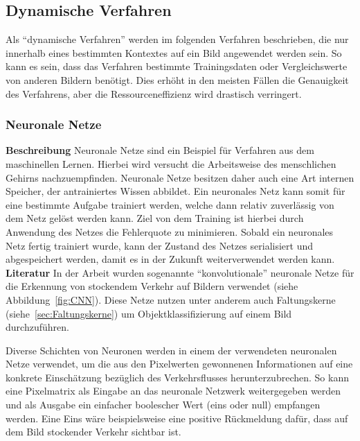\subsection{Dynamische Verfahren}
Als "`dynamische Verfahren"' werden im folgenden Verfahren beschrieben, die nur innerhalb eines bestimmten Kontextes auf ein Bild angewendet werden sein. So kann es sein, dass das Verfahren bestimmte Trainingsdaten oder Vergleichswerte von anderen Bildern benötigt. Dies erhöht in den meisten Fällen die Genauigkeit des Verfahrens, aber die Ressourceneffizienz wird drastisch verringert.
\subsubsection{Neuronale Netze}
\textbf{Beschreibung}\newline
Neuronale Netze sind ein Beispiel für Verfahren aus dem maschinellen Lernen.
Hierbei wird versucht die Arbeitsweise des menschlichen Gehirns nachzuempfinden.
Neuronale Netze besitzen daher auch eine Art internen Speicher, der antrainiertes Wissen abbildet.
Ein neuronales Netz kann somit für eine bestimmte Aufgabe trainiert werden, welche dann relativ zuverlässig von dem Netz gelöst werden kann.
Ziel von dem Training ist hierbei durch Anwendung des Netzes die Fehlerquote zu minimieren.
Sobald ein neuronales Netz fertig trainiert wurde, kann der Zustand des Netzes serialisiert und abgespeichert werden, damit es in der Zukunft weiterverwendet werden kann.
\newline\newline
\textbf{Literatur}\newline
In der Arbeit \cite{hkkDhbw} wurden sogenannte "`konvolutionale"' neuronale Netze für die Erkennung von stockendem Verkehr auf Bildern verwendet (siehe Abbildung~\ref{fig:CNN}).
Diese Netze nutzen unter anderem auch Faltungskerne (siehe~\ref{sec:Faltungskerne}) um Objektklassifizierung auf einem Bild durchzuführen.

Diverse Schichten von Neuronen werden in einem der verwendeten neuronalen Netze verwendet, um die aus den Pixelwerten gewonnenen Informationen auf eine konkrete Einschätzung bezüglich des Verkehrsflusses herunterzubrechen.
So kann eine Pixelmatrix als Eingabe an das neuronale Netzwerk weitergegeben werden und als Ausgabe ein einfacher boolescher Wert (eins oder null) empfangen werden. 
Eine Eins wäre beispielsweise eine positive Rückmeldung dafür, dass auf dem Bild stockender Verkehr sichtbar ist.


